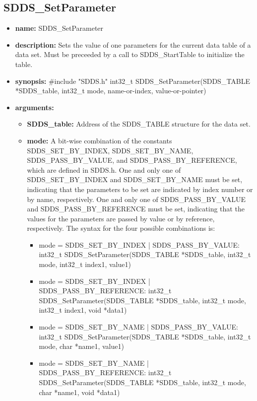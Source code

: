 \documentclass[11pt]{article}
\begin{document}
\subsection{SDDS\_SetParameter}
\label{SDDS_SetParameter}

\begin{itemize}
\item {\bf name:}\newline
SDDS\_SetParameter
\item {\bf description:}\newline
Sets the value of one parameters for the current data table of a data set. Must be preceeded by a call to SDDS\_StartTable to initialize the table.
\item {\bf synopsis:} \#include "SDDS.h"\newline
int32\_t SDDS\_SetParameter(SDDS\_TABLE *SDDS\_table, int32\_t mode,  name-or-index,  value-or-pointer)
\item {\bf arguments:}
\begin{itemize}
\item {\bf SDDS\_table:} Address of the SDDS\_TABLE structure for the data set.
\item {\bf mode:} A bit-wise combination of the constants SDDS\_SET\_BY\_INDEX, SDDS\_SET\_BY\_NAME, SDDS\_PASS\_BY\_VALUE, and SDDS\_PASS\_BY\_REFERENCE, which are defined in  SDDS.h. One and only one of SDDS\_SET\_BY\_INDEX and SDDS\_SET\_BY\_NAME must be set, indicating that the parameters to be set are indicated by index number or by name, respectively. One and only one of SDDS\_PASS\_BY\_VALUE and SDDS\_PASS\_BY\_REFERENCE must be set, indicating that the values for the parameters are passed by value or by reference, respectively. The syntax for the four possible combinations is:
\begin{itemize}
\item mode = SDDS\_SET\_BY\_INDEX | SDDS\_PASS\_BY\_VALUE: int32\_t SDDS\_SetParameter(SDDS\_TABLE *SDDS\_table, int32\_t mode, int32\_t index1,  value1)
\item mode = SDDS\_SET\_BY\_INDEX | SDDS\_PASS\_BY\_REFERENCE: int32\_t SDDS\_SetParameter(SDDS\_TABLE *SDDS\_table, int32\_t mode, int32\_t index1, void *data1)
\item mode = SDDS\_SET\_BY\_NAME | SDDS\_PASS\_BY\_VALUE: int32\_t SDDS\_SetParameter(SDDS\_TABLE *SDDS\_table, int32\_t mode, char *name1,  value1)
\item mode = SDDS\_SET\_BY\_NAME | SDDS\_PASS\_BY\_REFERENCE: int32\_t SDDS\_SetParameter(SDDS\_TABLE *SDDS\_table, int32\_t mode, char *name1, void *data1)  

\end{itemize}
\end{itemize}
\end{itemize}
\end{document}
